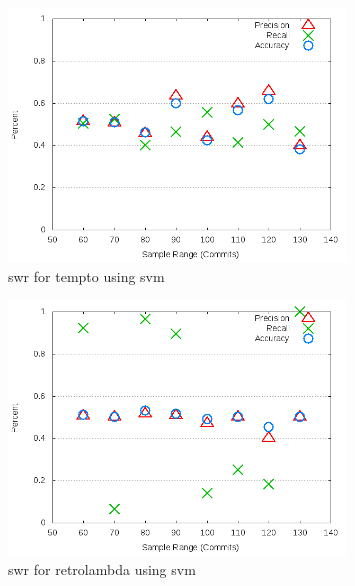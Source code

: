 \begin{figure}[!t]
\centering
\includegraphics[width=0.8\textwidth]{images/svm/test_1/tempto_sample_range.png}
\caption{\gls{swr} for tempto using \gls{svm}}
\label{fig:test_1_tempto_svm}
\end{figure}

\begin{figure}[!t]
\centering
\includegraphics[width=0.8\textwidth]{images/svm/test_1/retrolambda_sample_range.png}
\caption{\gls{swr} for retrolambda using \gls{svm}}
\label{fig:test_1_retrolambda_svm}
\end{figure}

